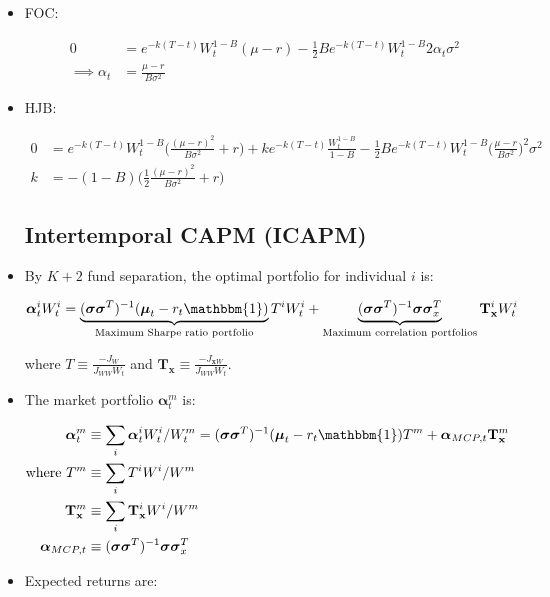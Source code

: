 \documentclass{article}
\newcommand{\xbf}{\mathbf{x}}
\newcommand{\Tbf}{\mathbf{T}}
\newcommand{\mubf}{\boldsymbol{\mu}}
\newcommand{\alphabf}{\boldsymbol{\alpha}}
\newcommand{\sigmabf}{\boldsymbol{\sigma}}
\newcommand{\onebf}{\mathbbm{1}}
\begin{document}
\begin{itemize}
\item FOC: 

\begin{align*}
0 &= e^{-k(T-t)} W_t^{1-B} (\mu -r) - \frac{1}{2} B e^{-k(T-t)} W_t^{1-B} 2 \alpha_t \sigma^2 \\
\implies
\alpha_t &= \frac{\mu - r}{B \sigma^2}
\end{align*}

\item HJB: 

\begin{align*}
0 &= e^{-k(T-t)} W_t^{1-B} \Bigg(\frac{(\mu -r)^2}{B \sigma^2} + r \Bigg) + ke^{-k(T-t)} \frac{W_t^{1-B}}{1-B} - \frac{1}{2} B e^{-k(T-t)} W_t^{1-B} \Bigg(\frac{\mu - r}{B\sigma^2}\Bigg)^2 \sigma^2\\
k &= -(1-B) \Bigg(\frac{1}{2} \frac{(\mu - r)^2}{B \sigma^2} + r \Bigg)
\end{align*}

\subsection*{Intertemporal CAPM (ICAPM)}

\item By $K + 2$ fund separation, the optimal portfolio for individual $i$ is:

$$
\alphabf_t^i W_t^i = \underbrace{(\sigmabf \sigmabf^T)^{-1} (\mubf_t - r_t \onebf)}_{\text{Maximum Sharpe ratio portfolio}} T^i W_t^i  + \underbrace{(\sigmabf \sigmabf^T)^{-1} \sigmabf \sigmabf_x^T}_{\text{Maximum correlation portfolios}} \Tbf_\xbf^i W_t^i
$$

where $T \equiv \frac{-J_W}{J_{WW} W_t}$ and $\Tbf_\xbf \equiv \frac{-J_{\xbf W}}{J_{WW} W_t}$.

\item The market portfolio $\alphabf_t^m$ is:

\begin{align*}
\alphabf_t^m &\equiv \sum_i \alphabf_t^i W_t^i / W_t^m = (\sigmabf \sigmabf^T)^{-1} (\mubf_t - r_t \onebf) T^m + \alphabf_{MCP, t} \Tbf_\xbf^m \\
\text{where }
T^m & \equiv \sum_i T^i W^i/W^m \\
\Tbf^m_\xbf & \equiv \sum_i \Tbf_\xbf^i W^i / W^m \\
\alphabf_{MCP, t} &\equiv (\sigmabf \sigmabf^T)^{-1} \sigmabf \sigmabf_x^T
\end{align*}

\item Expected returns are:


\end{itemize}
\end{document}
